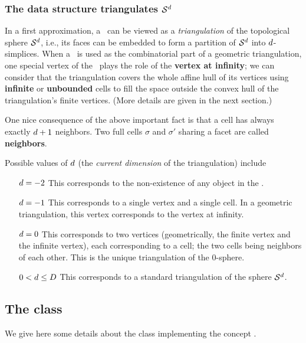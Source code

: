 \subsubsection{The data structure triangulates $\mathcal S^{d}$}

In a first approximation, a \tds\ can be viewed as
a \emph{triangulation} of the topological sphere $\mathcal S^{d}$,
i.e., its faces can be embedded to form a partition of
$\mathcal S^{d}$ into $d$-simplices. When a 
\tds\ is used as the combinatorial part of a geometric triangulation, one
special vertex of the \tds\ plays the role of the \textbf{vertex at
infinity}; we can consider that the triangulation covers the whole
affine hull of its vertices
using \textbf{infinite} or \textbf{unbounded} cells to fill the space  outside the convex
hull of the triangulation's finite vertices. (More details are given in the next section.)


One nice consequence of the above important fact is that a cell has
always exactly  $d+1$ neighbors.
Two  full cells $\sigma$ and $\sigma'$ sharing a facet are called
\textbf{neighbors}.


Possible values of $d$ (the \emph{current dimension} of the triangulation) include
\begin{itemize}
\item[$d=-2$] This corresponds to the non-existence of any object in
  the \tds.
\item[$d=-1$] This corresponds to a single vertex and a single cell. In a
geometric triangulation, this vertex corresponds to the vertex at infinity.
\item[$d=0$] This corresponds to two vertices (geometrically, the finite vertex and
  the infinite vertex), each corresponding to  a cell;
the two cells being neighbors of each other. This is the unique
triangulation of the $0$-sphere.
\item[$0<d\le D$] This corresponds to a standard triangulation of
the sphere $\mathcal S^{d}$.
\end{itemize}


\subsection{The class \label{triangulation:tds:impl}}

We give here some details about the class
implementing the concept .


